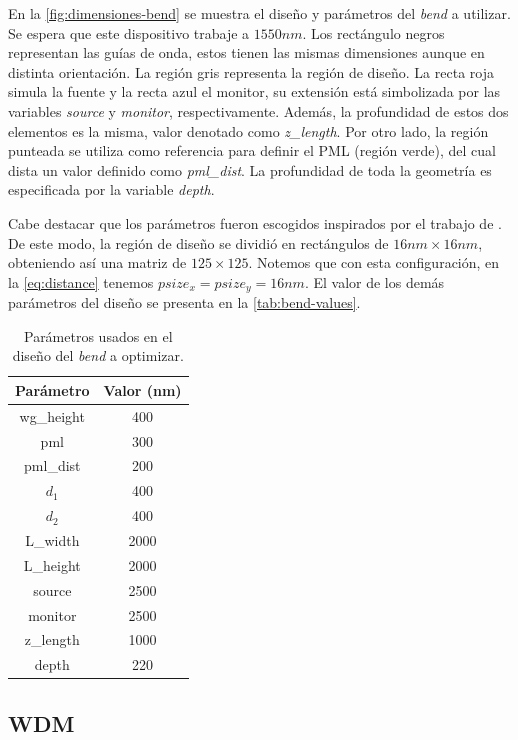 En la \autoref{fig:dimensiones-bend} se muestra el diseño y parámetros del \emph{bend} a utilizar.
Se espera que este dispositivo trabaje a $1550 nm$.
Los rectángulo negros representan las guías de onda, estos tienen las mismas dimensiones aunque en distinta orientación.
La región gris representa la región de diseño.
La recta roja simula la fuente y la recta azul el monitor, su extensión está
simbolizada por las variables \emph{source} y \emph{monitor}, respectivamente.
Además, la profundidad de estos dos elementos es la misma, valor denotado como \emph{z\_length}.
Por otro lado, la región punteada se utiliza como referencia para definir el PML (región verde),
del cual dista un valor definido como \emph{pml\_dist}. 
La profundidad de toda la geometría es especificada por la variable \emph{depth}.

Cabe destacar que los parámetros fueron escogidos inspirados por el trabajo de \cite{Su2020}.
De este modo, la región de diseño se dividió en rectángulos de $16nm \times 16 nm$, obteniendo así una
matriz de $125 \times 125$.
Notemos que con esta configuración, en la \autoref{eq:distance} tenemos $psize_x = psize_y = 16 nm$.
El valor de los demás parámetros del diseño se presenta en la \autoref{tab:bend-values}.

\begin{table}[ht]
    \centering
    \begin{tabular}{|c|c|}
    \hline 
    Parámetro &  Valor (nm) \\
    \hline 
    wg\_height & 400 \\
    pml & 300 \\
    pml\_dist & 200 \\
    $d_1$ & 400 \\
    $d_2$ & 400 \\
    L\_width & 2000 \\
    L\_height & 2000 \\
    source & 2500 \\
    monitor & 2500 \\
    z\_length & 1000 \\
    depth & 220 \\
    \hline 
    \end{tabular}
    \caption{Parámetros usados en el diseño del \emph{bend} a optimizar.}
    \label{tab:bend-values}
\end{table}

\subsection{WDM}

